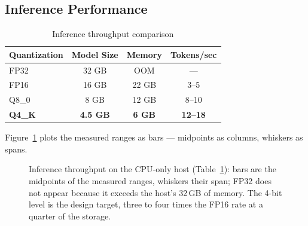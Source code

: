 \documentclass[11pt,a4paper]{article}
\theoremstyle{plain}
\theoremstyle{definition}
\begin{document}
\subsection{Inference Performance}

\begin{table}[h]
\centering
\caption{Inference throughput comparison}
\begin{tabular}{lccc}
\toprule
\textbf{Quantization} & \textbf{Model Size} & \textbf{Memory} & \textbf{Tokens/sec} \\
\midrule
FP32 & 32 GB & OOM & --- \\
FP16 & 16 GB & 22 GB & 3--5 \\
Q8\_0 & 8 GB & 12 GB & 8--10 \\
\textbf{Q4\_K} & \textbf{4.5 GB} & \textbf{6 GB} & \textbf{12--18} \\
\bottomrule
\end{tabular}
\label{tab:inference}
\end{table}

Figure~\ref{fig:inference} plots the measured ranges as bars --- midpoints as
columns, whiskers as spans.

\begin{figure}[h]
\centering
{}
\caption{Inference throughput on the CPU-only host
(Table~\protect\ref{tab:inference}): bars are the midpoints of the measured ranges,
whiskers their span; FP32 does not appear because it exceeds the host's
32\,GB of memory. The 4-bit level is the design target, three to four
times the FP16 rate at a quarter of the storage.}
\label{fig:inference}
\end{figure}
\end{document}
